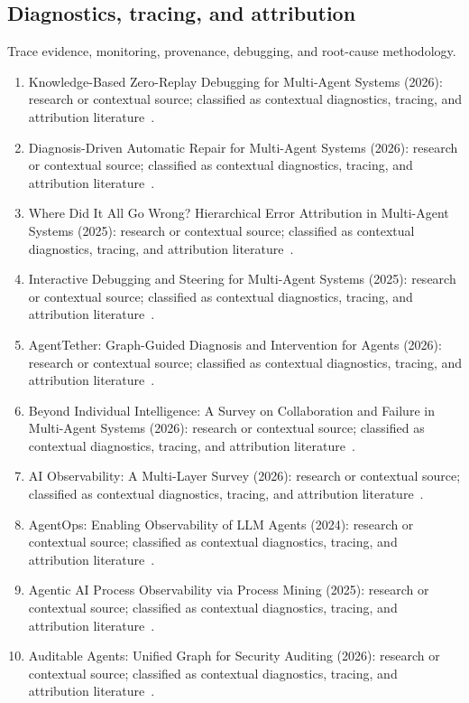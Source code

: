 \subsection{Diagnostics, tracing, and attribution}
Trace evidence, monitoring, provenance, debugging, and root-cause methodology.
\begin{enumerate}
\setlength{\itemsep}{1pt}\setlength{\parskip}{0pt}
\footnotesize
\item Knowledge-Based Zero-Replay Debugging for Multi-Agent Systems (2026): research or contextual source; classified as contextual diagnostics, tracing, and attribution literature~\cite{ext001}.
\item Diagnosis-Driven Automatic Repair for Multi-Agent Systems (2026): research or contextual source; classified as contextual diagnostics, tracing, and attribution literature~\cite{ext002}.
\item Where Did It All Go Wrong? Hierarchical Error Attribution in Multi-Agent Systems (2025): research or contextual source; classified as contextual diagnostics, tracing, and attribution literature~\cite{ext004}.
\item Interactive Debugging and Steering for Multi-Agent Systems (2025): research or contextual source; classified as contextual diagnostics, tracing, and attribution literature~\cite{ext005}.
\item {AgentTether}: Graph-Guided Diagnosis and Intervention for Agents (2026): research or contextual source; classified as contextual diagnostics, tracing, and attribution literature~\cite{ext007}.
\item Beyond Individual Intelligence: A Survey on Collaboration and Failure in Multi-Agent Systems (2026): research or contextual source; classified as contextual diagnostics, tracing, and attribution literature~\cite{ext008}.
\item {AI} Observability: A Multi-Layer Survey (2026): research or contextual source; classified as contextual diagnostics, tracing, and attribution literature~\cite{ext009}.
\item {AgentOps}: Enabling Observability of {LLM} Agents (2024): research or contextual source; classified as contextual diagnostics, tracing, and attribution literature~\cite{ext011}.
\item Agentic {AI} Process Observability via Process Mining (2025): research or contextual source; classified as contextual diagnostics, tracing, and attribution literature~\cite{ext014}.
\item Auditable Agents: Unified Graph for Security Auditing (2026): research or contextual source; classified as contextual diagnostics, tracing, and attribution literature~\cite{ext015}.

\end{enumerate}
